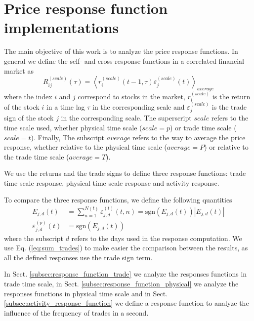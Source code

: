 \section{Price response function implementations}
\label{sec:response_functions_imp}

The main objective of this work is to analyze the price response functions. In
general we define the self- and cross-response functions in a correlated
financial market as
\begin{equation}\label{eq:response_general}
    R^{\left(scale\right)}_{ij}\left(\tau\right)=\left\langle
    r^{\left(scale\right)}_{i}\left(t-1, \tau\right)
    \varepsilon^{\left(scale\right)}_{j} \left(t\right)\right\rangle_{average}
\end{equation}
where the index $i$ and $j$ correspond to stocks in the market,
$r^{\left(scale\right)}_{i}$ is the return of the stock $i$ in a time lag
$\tau$ in the corresponding scale and $\varepsilon^{\left(scale\right)}_{j}$ is
the trade sign of the stock $j$ in the corresponding scale. The superscript
$scale$ refers to the time scale used, whether physical time scale
($scale = p$) or trade time scale ($scale = t$). Finally, The subscript
$average$ refers to the way to average the price response, whether relative to
the physical time scale ($average = P$) or relative to the trade time scale
($average = T$).

We use the returns and the trade signs to define three response functions:
trade time scale response, physical time scale response and activity response.

To compare the three response functions, we define the following quantities
\begin{align}
    E_{j,d}\left(t\right)&=\sum_{n=1}^{N\left(t\right)}
    \varepsilon_{j,d}^{\left(t\right)}\left(t,n\right) =
    \text{sgn}\left(E_{j,d}\left(t\right)\right)
    \left|E_{j,d}\left(t\right)\right|\label{eq:sum_trades}\\
    \varepsilon_{j,d}^{\left(p\right)}\left(t\right)&=
    \text{sgn}\left(E_{j,d}\left(t\right)\right)\label{eq:sign_sum_trades}
\end{align}
where the subscript $d$ refers to the days used in the response computation.
We use Eq. (\ref{eq:sum_trades}) to make easier the comparison between the
results, as all the defined responses use the trade sign term.

In Sect. \ref{subsec:response_function_trade} we analyze the responses
functions in trade time scale, in Sect. \ref{subsec:response_function_physical}
we analyze the responses functions in physical time scale and in Sect.
\ref{subsec:activity_response_function} we define a response function to
analyze the influence of the frequency of trades in a second.

